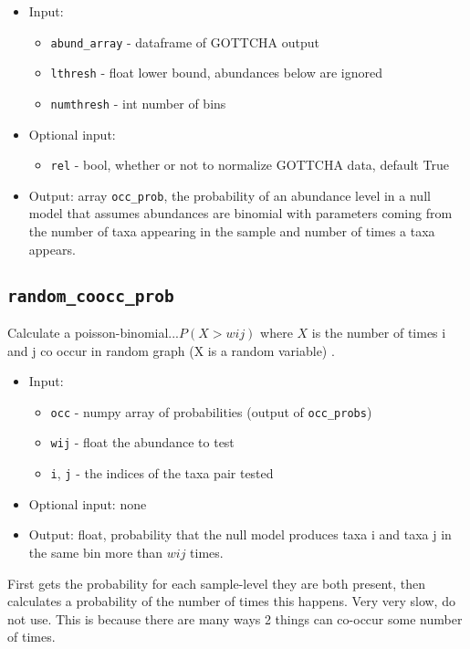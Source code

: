 \documentclass[10pt]{article}
\theoremstyle{definition}
\numberwithin{theorem}{section}
\numberwithin{definition}{section}
\numberwithin{lemma}{section}
\numberwithin{corollary}{section}
\numberwithin{clm}{section}
\numberwithin{rmk}{section}
\begin{document}
\begin{itemize}
	\item Input: 
	\begin{itemize}
		\item \verb|abund_array| - dataframe of GOTTCHA output
		\item \verb|lthresh| - float lower bound, abundances below are ignored
		\item \verb|numthresh| - int number of bins
	\end{itemize}
	\item Optional input: 
	\begin{itemize}
		\item \verb|rel| - bool, whether or not to normalize GOTTCHA data, default True
	\end{itemize}
	\item Output: array \verb|occ_prob|, the probability of an abundance level in a null model that assumes abundances are binomial with parameters coming from the number of taxa appearing in the sample and number of times a taxa appears.
\end{itemize}

\cprotect \subsection{\verb|random_coocc_prob|}
Calculate a poisson-binomial...$P(X > wij)$ where $X$ is the number of times i and j co occur in random graph (X is a random variable) \cite{coocc}.
\begin{itemize}
	\item Input: 
	\begin{itemize}
		\item \verb|occ| - numpy array of probabilities (output of \verb|occ_probs|) 
		\item \verb|wij| - float the abundance to test
		\item  \verb|i|, \verb|j| -  the indices of the taxa pair tested
	\end{itemize}
	\item Optional input: none
	\item Output: float, probability that the null model produces taxa i and taxa j in the same bin more than $wij$ times.
\end{itemize}

First gets the probability for each sample-level they are both present, then calculates a probability of the number of times this happens. Very very slow, do not use. This is because there are many ways 2 things can co-occur some number of times.
\end{document}
